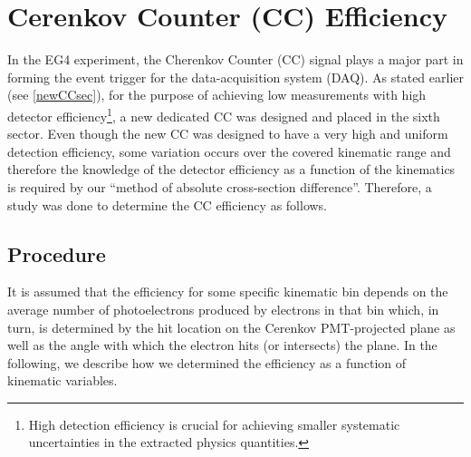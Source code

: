 \hspace{0.5cm}





\section{Cerenkov Counter (CC) Efficiency}

In the EG4 experiment, the Cherenkov Counter (CC) signal plays a major part in forming the event trigger for %
the data-acquisition system (DAQ). As stated earlier (see \ref{newCCsec}), for the purpose of achieving low \qsqs measurements with high detector efficiency\footnote{High detection efficiency is crucial for achieving smaller systematic uncertainties in the extracted physics quantities.}, a new %
dedicated CC was designed and placed in the sixth sector. Even though the new CC was designed to have a very high and uniform detection efficiency, some variation occurs over the covered kinematic range and therefore the knowledge of the detector efficiency as a function of the kinematics is required by our ``method of absolute cross-section difference''. %
Therefore, a study was done to determine the CC efficiency as follows. 



\subsection{Procedure}

It is assumed that the efficiency for some specific kinematic bin depends on the average number of photoelectrons %
produced by electrons in that bin which, in turn, is determined by the hit location on the Cerenkov PMT-projected plane %
as well as the angle with which the %
electron hits (or intersects) the plane. In the following, we describe how we determined the efficiency as a function of kinematic variables. %


